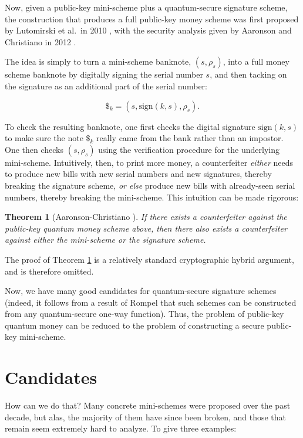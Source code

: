 \documentclass[11pt]{report}
\theoremstyle{plain}
\newtheorem{theorem}{Theorem}[section]
\theoremstyle{definition}
\begin{document}
Now, given a public-key mini-scheme plus a quantum-secure signature scheme, the construction that produces a full public-key money scheme was first proposed by Lutomirski et al.\ in 2010 \cite{breaking}, with the security analysis given by Aaronson and Christiano in 2012 \cite{achristiano}.

The idea is simply to turn a mini-scheme banknote, $(s,\rho_s)$, into a full money scheme banknote by digitally signing the serial number $s$, and then tacking on the signature as an additional part of the serial number:

$$\$_k = (s, \text{sign}(k,s), \rho_s).$$

To check the resulting banknote, one first checks the digital signature $\text{sign}(k,s)$ to make sure the note $\$_k$ really came from the bank rather than an impostor.  One then checks $(s, \rho_s)$ using the verification procedure for the underlying mini-scheme.  Intuitively, then, to print more money, a counterfeiter {\em either} needs to produce new bills with new serial numbers and new signatures, thereby breaking the signature scheme, {\em or else} produce new bills with already-seen serial numbers, thereby breaking the mini-scheme.  This intuition can be made rigorous:

\begin{theorem}[Aaronson-Christiano \cite{achristiano}]
\label{standardcons}
If there exists a counterfeiter against the public-key quantum money scheme above, then there also exists a counterfeiter against either the mini-scheme or the signature scheme.
\end{theorem}

The proof of Theorem \ref{standardcons} is a relatively standard cryptographic hybrid argument, and is therefore omitted.

Now, we have many good candidates for quantum-secure signature schemes (indeed, it follows from a result of Rompel \cite{rompel} that such schemes can be constructed from any quantum-secure one-way function).  Thus, the problem of public-key quantum money can be reduced to the problem of constructing a secure public-key mini-scheme.

\section{Candidates}

How can we do that?  Many concrete mini-schemes were proposed over the past decade, but alas, the majority of them have since been broken, and those that remain seem extremely hard to analyze.  To give three examples:
\end{document}
